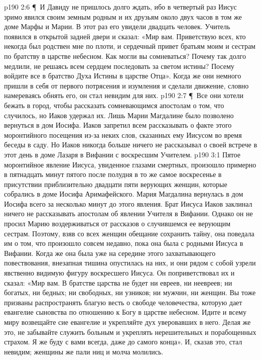 \vs p190 2:6 \P\ И Давиду не пришлось долго ждать, ибо в четвертый раз Иисус зримо явился своим земным родным и их друзьям около двух часов в том же доме Марфы и Марии. В этот раз его увидели двадцать человек. Учитель появился в открытой задней двери и сказал: «Мир вам. Приветствую всех, кто некогда был родствен мне по плоти, и сердечный привет братьям моим и сестрам по братству в царстве небесном. Как могли вы сомневаться? Почему так долго медлили, не решаясь всем сердцем последовать за светом истины? Посему войдите все в братство Духа Истины в царстве Отца». Когда же они немного пришли в себя от первого потрясения и изумления и сделали движение, словно намереваясь обнять его, он стал невидим для них.
\vs p190 2:7 \P\ Все они хотели бежать в город, чтобы рассказать сомневающимся апостолам о том, что случилось, но Иаков удержал их. Лишь Марии Магдалине было позволено вернуться в дом Иосифа. Иаков запретил всем рассказывать о факте этого моронтийного посещения из\hyp{}за неких слов, сказанных ему Иисусом во время беседы в саду. Но Иаков никогда больше ничего не рассказывал о своей встрече в этот день в доме Лазаря в Вифании с воскресшим Учителем.
\vs p190 3:1 Пятое моронтийное явление Иисуса, увиденное глазами смертных, произошло примерно в пятнадцать минут пятого после полудня в то же самое воскресенье в присутствии приблизительно двадцати пяти верующих женщин, которые собрались в доме Иосифа Аримафейского. Мария Магдалина вернулась в дом Иосифа всего за несколько минут до этого явления. Брат Иисуса Иаков заклинал ничего не рассказывать апостолам об явлении Учителя в Вифании. Однако он не просил Марию воздерживаться от рассказов о случившемся ее верующим сестрам. Поэтому, взяв со всех женщин обещание сохранить тайну, она поведала им о том, что произошло совсем недавно, пока она была с родными Иисуса в Вифании. Когда же она была уже на середине этого захватывающего повествования, внезапная тишина опустилась на них, и они рядом с собой узрели явственно видимую фигуру воскресшего Иисуса. Он поприветствовал их и сказал: «Мир вам. В братстве царства не будет ни евреев, ни неевреев; ни богатых, ни бедных; ни свободных, ни узников; ни мужчин, ни женщин. Вы тоже призваны распространять благую весть о свободе человечества, которую дает евангелие сыновства по отношению к Богу в царстве небесном. Идите и всему миру возвещайте сие евангелие и укрепляйте дух уверовавших в него. Делая же это, не забывайте служить больным и укреплять нерешительных и порабощенных страхом. Я же буду с вами всегда, даже до самого конца». И, сказав это, стал невидим; женщины же пали ниц и молча молились.
